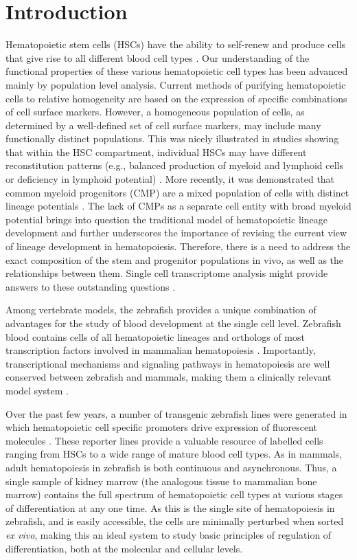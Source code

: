 \section{Introduction}

Hematopoietic stem cells (HSCs) have the ability to self-renew and produce cells that give rise to all different blood cell types \cite{Orkin2008-os}. Our understanding of the functional properties of these various hematopoietic cell types has been advanced mainly by population level analysis. Current methods of purifying hematopoietic cells to relative homogeneity are based on the expression of specific combinations of cell surface markers. However, a homogeneous population of cells, as determined by a well-defined set of cell surface markers, may include many functionally distinct populations. This was nicely illustrated in studies showing that within the HSC compartment, individual HSCs may have different reconstitution patterns (e.g., balanced production of myeloid and lymphoid cells or deficiency in lymphoid potential) \cite{Muller-Sieburg2012-vb}. More recently, it was demonstrated that common myeloid progenitors (CMP) are a mixed population of cells with distinct lineage potentials \cite{Notta2015-ng}. The lack of CMPs as a separate cell entity with broad myeloid potential brings into question the traditional model of hematopoietic lineage development and further underscores the importance of revising the current view of lineage development in hematopoiesis. Therefore, there is a need to address the exact composition of the stem and progenitor populations in vivo, as well as the relationships between them. Single cell transcriptome analysis might provide answers to these outstanding questions \cite{Cvejic2015-ra}.

Among vertebrate models, the zebrafish provides a unique combination of advantages for the study of blood development at the single cell level. Zebrafish blood contains cells of all hematopoietic lineages and orthologs of most transcription factors involved in mammalian hematopoiesis \cite{Hsia2005-fg, Song2004-jn}. Importantly, transcriptional mechanisms and signaling pathways in hematopoiesis are well conserved between zebrafish and mammals, making them a clinically relevant model system \cite{Jagannathan-Bogdan2013-du}.

Over the past few years, a number of transgenic zebrafish lines were generated in which hematopoietic cell specific promoters drive expression of fluorescent molecules \cite{Carradice2008-lz}. These reporter lines provide a valuable resource of labelled cells ranging from HSCs to a wide range of mature blood cell types. As in mammals, adult hematopoiesis in zebrafish is both continuous and asynchronous. Thus, a single sample of kidney marrow (the analogous tissue to mammalian bone marrow) contains the full spectrum of hematopoietic cell types at various stages of differentiation at any one time. As this is the single site of hematopoiesis in zebrafish, and is easily accessible, the cells are minimally perturbed when sorted \textit{ex vivo}, making this an ideal system to study basic principles of regulation of differentiation, both at the molecular and cellular levels.


